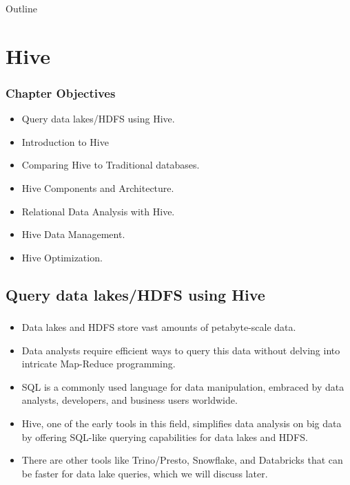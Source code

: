 \begin{frame}{Outline}
	\tableofcontents
\end{frame}
\section{Hive}



\begin{frame}
\frametitle{Chapter Objectives}

\begin{itemize}
	\item<1-> Query data lakes/HDFS using Hive. \pause
	\item<2-> Introduction to Hive \pause
	\item<3-> Comparing Hive to Traditional databases.
	\item<4-> Hive Components and Architecture. \pause
	\item<5-> Relational Data Analysis with Hive. \pause
	\item<6-> Hive Data Management. \pause
	\item<7-> Hive Optimization. \pause
\end{itemize}

\end{frame}

\subsection{Query data lakes/HDFS using Hive}
\begin{frame}
	\frametitle{\subsecname}
	\begin{itemize} 
		\item Data lakes and HDFS store vast amounts of petabyte-scale data. \pause
		\item Data analysts require efficient ways to query this data without delving into intricate Map-Reduce programming.\pause
		\item SQL is a commonly used language for data manipulation, embraced by data analysts, developers, and business users worldwide.\pause
		\item Hive, one of the early tools in this field, simplifies data analysis on big data by offering SQL-like querying capabilities for data lakes and HDFS.\pause
		\item There are other tools like Trino/Presto, Snowflake, and Databricks that can be faster for data lake queries, which we will discuss later.\pause
	\end{itemize}
	\end{frame}

